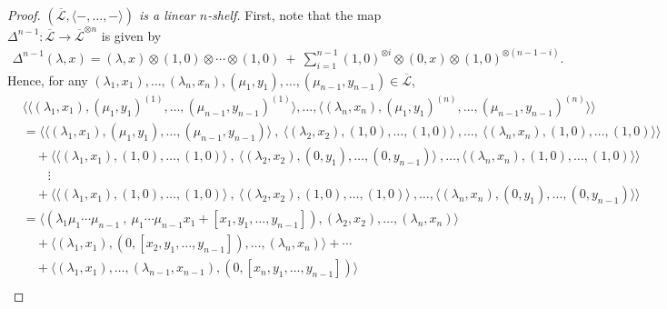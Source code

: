 \documentclass[a4paper,reqno,10pt]{amsart}
\theoremstyle{plain}
\theoremstyle{definition}
\theoremstyle{remark}
\begin{document}
\begin{proof}
     \medskip

   {\em  $( \overline{\mathcal{L}}, {\langle -, \ldots, - \rangle } )$ is a linear $n$-shelf.}  First, note that the map $\Delta^{n-1} : \overline{\mathcal{L}} \rightarrow \overline{\mathcal{L}}^{\otimes n}$ is given by
     \begin{align*}
         \Delta^{n-1} (\lambda, x) = (\lambda , x) \otimes (1, 0) \otimes \cdots \otimes (1, 0) ~ + ~ \sum_{i=1}^{n-1} (1, 0)^{\otimes i} \otimes (0, x) \otimes (1, 0)^{\otimes (n-1-i)}.
     \end{align*}
     Hence, for any $(\lambda_1, x_1), \ldots , (\lambda_n, x_n), (\mu_1, y_1), \ldots, (\mu_{n-1}, y_{n-1}) \in \overline{\mathcal{L}}$,
     \begin{align*}
         &\big\langle \langle (\lambda_1, x_1), (\mu_1, y_1)^{(1)}, \ldots, (\mu_{n-1}, y_{n-1})^{(1)} \rangle, \ldots, \langle (\lambda_n, x_n), (\mu_1, y_1)^{(n)}, \ldots, (\mu_{n-1}, y_{n-1})^{(n)} \rangle \big\rangle \\
         &=  \big\langle \langle (\lambda_1, x_1), (\mu_1, y_1), \ldots , (\mu_{n-1}, y_{n-1}) \rangle ~ \! , ~ \! \langle (\lambda_2, x_2), (1, 0), \ldots, (1, 0) \rangle ~ \! , \ldots, ~ \! \langle (\lambda_n, x_n), (1, 0), \ldots, (1, 0) \rangle   \rangle \\
        & \quad + \big\langle \langle (\lambda_1, x_1), (1, 0), \ldots, (1, 0) \rangle ~ \!, ~ \! \langle (\lambda_2, x_2), (0, y_1), \ldots, (0, y_{n-1}) \rangle ~ \!, \ldots, \langle (\lambda_n, x_n ) , (1, 0), \ldots, (1, 0) \rangle \big\rangle  \\ 
        & \qquad \! \! \vdots \\
        & \quad + \big\langle \langle (\lambda_1, x_1), (1, 0), \ldots, (1, 0) \rangle ~ \! , ~ \! \langle (\lambda_2, x_2), (1, 0), \ldots, (1, 0)  \rangle ~ \! , \ldots, \langle (\lambda_n, x_n) , (0, y_1), \ldots, (0, y_{n-1})   \rangle \big\rangle \\
         &= \langle (\lambda_1 \mu_1 \cdots \mu_{n-1} ~ \!, ~ \! \mu_1 \cdots \mu_{n-1} x_1 + [x_1, y_1, \ldots, y_{n-1}]), (\lambda_2, x_2) , \ldots , (\lambda_n, x_n) \rangle \\
         & \quad  + \langle (\lambda_1, x_1), (0, [x_2, y_1, \ldots, y_{n-1}]), \ldots, (\lambda_n, x_n)  \rangle + \cdots  \\
         & \quad + \langle  (\lambda_1, x_1), \ldots, (\lambda_{n-1}, x_{n-1}), (0, [x_n, y_1, \ldots, y_{n-1}] ) \rangle 
\end{align*}
         \begin{align*}

\end{align*}
\end{proof}
\end{document}
